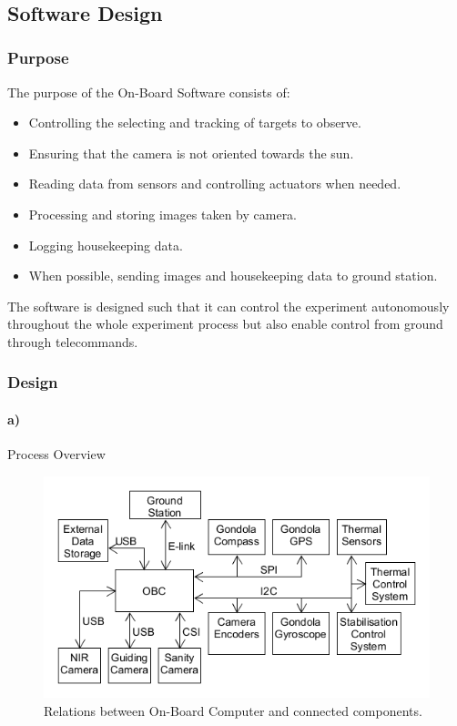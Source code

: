 $  $\pagebreak
\subsection{Software Design}

\subsubsection{Purpose}

The purpose of the On-Board Software consists of:
\begin{itemize}
	\item Controlling the selecting and tracking of targets to observe.
	\item Ensuring that the camera is not oriented towards the sun.
	\item Reading data from sensors and controlling actuators when needed.
	\item Processing and storing images taken by camera.
	\item Logging housekeeping data.
	\item When possible, sending images and housekeeping data to ground station.
\end{itemize}

The software is designed such that it can control the experiment autonomously throughout the whole experiment process but also enable control from ground through telecommands.

\subsubsection{Design}
\label{sec:4.8.2}

\paragraph{a)} Process Overview

\begin{figure}[H]
	\centering
	\includegraphics[width=.9\textwidth]{4-experiment-design/img/software/process-overview.png}
	\caption{Relations between On-Board Computer and connected components.}
	\label{fig:software-process-overview}
\end{figure}

